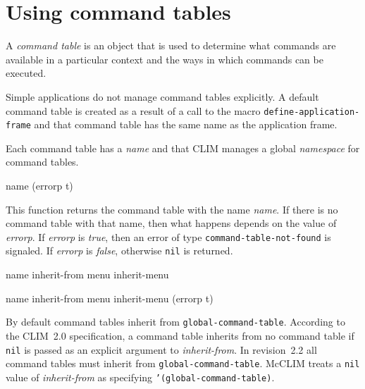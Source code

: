 \chapter{Using command tables}

A \emph{command table} is an object that is used to determine what
commands are available in a particular context and the ways in which
commands can be executed.

Simple applications do not manage command tables explicitly.  A
default command table is created as a result of a call to the macro
\texttt{define-application-frame} and that command table has the same
name as the application frame.

Each command table has a \emph{name} and that CLIM manages a global
\emph{namespace} for command tables.

 {name \key (errorp t)}

This function returns the command table with the name \textit{name}.
If there is no command table with that name, then what happens depends
on the value of \textit{errorp}.  If \textit{errorp} is \emph{true},
then an error of type \texttt{command-table-not-found} is signaled. 
If \textit{errorp} is \emph{false}, otherwise \texttt{nil} is
returned.

 {name \key inherit-from menu
  inherit-menu}

 {name \key inherit-from menu
  inherit-menu (errorp t)}

By default command tables inherit from
\texttt{global-command-table}. According to the CLIM~2.0
specification, a command table inherits from no command table if
\texttt{nil} is passed as an explicit argument to
\textit{inherit-from}. In revision~2.2 all command tables must inherit
from \texttt{global-command-table}. McCLIM treats a \texttt{nil} value
of \textit{inherit-from} as specifying \texttt{'(global-command-table)}.

